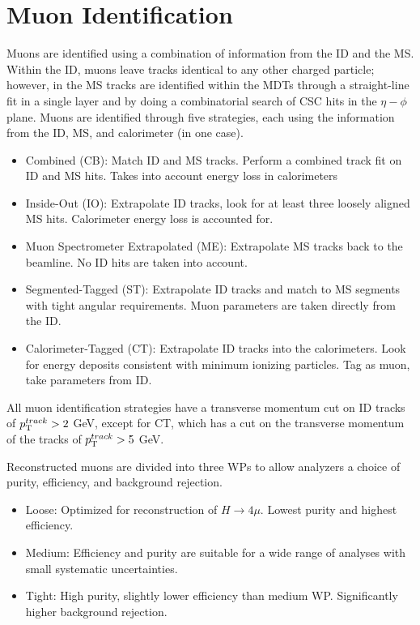 		\section{Muon Identification}\label{sec:reco-muon}
		Muons are identified using a combination of information from the \gls{ID} and the \gls{MS}. Within the \gls{ID}, muons leave tracks identical to any other charged particle; however, in the \gls{MS} tracks are identified within the MDTs through a straight-line fit in a single layer and by doing a combinatorial search of CSC hits in the $\eta-\phi$ plane. \cite{muon-id} Muons are identified through five strategies, each using the information from the \gls{ID}, \gls{MS}, and calorimeter (in one case).
		\begin{itemize}
			\item Combined (\acrshort{CB}): Match \gls{ID} and \gls{MS} tracks. Perform a combined track fit on \gls{ID} and \gls{MS} hits. Takes into account energy loss in calorimeters
			\item Inside-Out (\acrshort{IO}): Extrapolate \gls{ID} tracks, look for at least three loosely aligned \gls{MS} hits. Calorimeter energy loss is accounted for.
			\item Muon Spectrometer Extrapolated (ME): Extrapolate \gls{MS} tracks back to the beamline. No \gls{ID} hits are taken into account.
			\item Segmented-Tagged (\acrshort{ST}): Extrapolate \gls{ID} tracks and match to \gls{MS} segments with tight angular requirements. Muon parameters are taken directly from the \gls{ID}.
			\item Calorimeter-Tagged (\acrshort{CT}): Extrapolate \gls{ID} tracks into the calorimeters. Look for energy deposits consistent with minimum ionizing particles. Tag as muon, take parameters from \gls{ID}.
		\end{itemize}
		All muon identification strategies have a transverse momentum cut on \gls{ID} tracks of $p_{\text{T}}^{track}> 2$ GeV, except for \acrshort{CT}, which has a cut on the transverse momentum of the tracks of $p_{\text{T}}^{track} > 5$ GeV.
		
		Reconstructed muons are divided into three \glspl{WP} to allow analyzers a choice of purity, efficiency, and background rejection. 
		\begin{itemize}
			\item Loose: Optimized for reconstruction of $H\to 4\mu$. Lowest purity and highest efficiency.
			\item Medium: Efficiency and purity are suitable for a wide range of analyses with small systematic uncertainties.
			\item Tight: High purity, slightly lower efficiency than medium WP. Significantly higher background rejection.
		\end{itemize}


